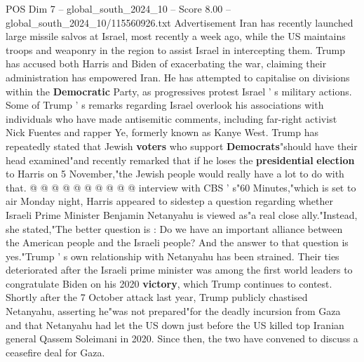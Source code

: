 \begin{textsample}{POS Dim 7 – global\_south\_2024\_10 – Score 8.00 – global\_south\_2024\_10/115560926.txt}
Advertisement Iran has recently launched large missile salvos at Israel, most recently a week ago, while the US maintains troops and weaponry in the region to assist Israel in intercepting them.
Trump has accused both Harris and Biden of exacerbating the war, claiming their administration has empowered Iran.
He has attempted to capitalise on divisions within the \textbf{Democratic} Party, as progressives protest Israel ' s military actions.
Some of Trump ' s remarks regarding Israel overlook his associations with individuals who have made antisemitic comments, including far-right activist Nick Fuentes and rapper Ye, formerly known as Kanye West.
Trump has repeatedly stated that Jewish \textbf{voters} who support \textbf{Democrats}"should have their head examined"and recently remarked that if he loses the \textbf{presidential} \textbf{election} to Harris on 5 November,"the Jewish people would really have a lot to do with that. @ @ @ @ @ @ @ @ @ @ interview with CBS ' s"60 Minutes,"which is set to air Monday night, Harris appeared to sidestep a question regarding whether Israeli Prime Minister Benjamin Netanyahu is viewed as"a real close ally."Instead, she stated,"The better question is : Do we have an important alliance between the American people and the Israeli people?
And the answer to that question is yes."Trump ' s own relationship with Netanyahu has been strained.
Their ties deteriorated after the Israeli prime minister was among the first world leaders to congratulate Biden on his 2020 \textbf{victory}, which Trump continues to contest.
Shortly after the 7 October attack last year, Trump publicly chastised Netanyahu, asserting he"was not prepared"for the deadly incursion from Gaza and that Netanyahu had let the US down just before the US killed top Iranian general Qassem Soleimani in 2020.
Since then, the two have convened to discuss a ceasefire deal for Gaza.

\end{textsample}
